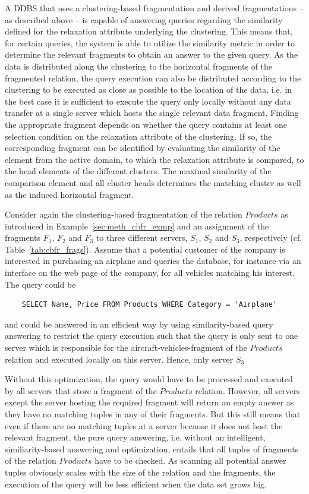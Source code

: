 A DDBS that uses a clustering-based fragmentation and derived fragmentations -- as described above -- is capable of answering queries regarding the 
similarity defined for the relaxation attribute underlying the clustering. This means that, for certain queries, the system is able to utilize the 
similarity metric in order to determine the relevant fragments to obtain an answer to the given query. As the data is distributed along the clustering to
the horizontal fragments of the fragmented relation, the query execution can also be distributed according to the clustering to be executed as close as
possible to the location of the data, i.e. in the best case it is sufficient to execute the query only locally without any data transfer at a single 
server which hosts the single relevant data fragment. Finding the appropriate fragment depends on whether the query contains at least one selection
condition on the relaxation attribute of the clustering. If so, the corresponding fragment can be identified by evaluating the similarity of the element
from the active domain, to which the relaxation attribute is compared, to the head elements of the different clusters. The maximal similarity of the 
comparison element and all cluster heads determines the matching cluster as well as the induced horizontal fragment. 

\begin{exmp}
\label{sec:meth_sbqa_exmp}
Consider again the clustering-based fragmentation of the relation $Products$ as introduced in Example~\ref{sec:meth_cbfr_exmp} and an assignment of the 
fragments $F_1$, $F_2$ and $F_3$ to three different servers, $S_1$, $S_2$ and $S_3$, respectively (cf. Table~\ref{tab:cbfr_frags}). Assume that a potential
customer of the company is interested in purchasing an airplane and queries the database, for instance via an interface on the web page of the company, 
for all vehicles matching his interest. The query could be
\begin{verbatim}
    SELECT Name, Price FROM Products WHERE Category = 'Airplane'
\end{verbatim}
and could be answered in an efficient way by using similarity-based query answering to restrict the query execution such that the query is only sent to 
one server which is responsible for the aircraft-vehicles-fragment of the $Products$ relation and executed locally on this server. Hence, only server 
$S_3$

Without this optimization, the query would have to be processed and executed by all servers that store a fragment of the $Products$ relation. However, 
all servers except the server hosting the required fragment will return an empty answer as they have no matching tuples in any of their fragments. But 
this still means that even if there are no matching tuples at a server because it does not host the relevant fragment, the pure query answering, i.e.
without an intelligent, similiarity-based answering and optimization, entails that all tuples of fragments of the relation $Products$ have to be checked.
As scanning all potential answer tuples obviously scales with the size of the relation and the fragments, the execution of the query will be less 
efficient when the data set grows big.
\end{exmp}

